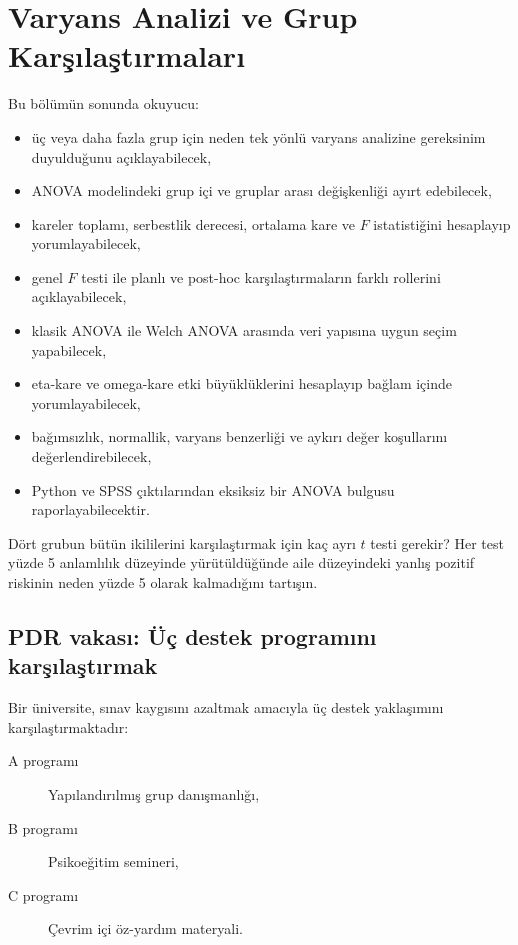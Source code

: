 \chapter{Varyans Analizi ve Grup Karşılaştırmaları}
\label{ch:anova}

\begin{hedefler}
Bu bölümün sonunda okuyucu:
\begin{itemize}
  \item üç veya daha fazla grup için neden tek yönlü varyans analizine gereksinim duyulduğunu açıklayabilecek,
  \item ANOVA modelindeki grup içi ve gruplar arası değişkenliği ayırt edebilecek,
  \item kareler toplamı, serbestlik derecesi, ortalama kare ve $F$ istatistiğini hesaplayıp yorumlayabilecek,
  \item genel $F$ testi ile planlı ve post-hoc karşılaştırmaların farklı rollerini açıklayabilecek,
  \item klasik ANOVA ile Welch ANOVA arasında veri yapısına uygun seçim yapabilecek,
  \item eta-kare ve omega-kare etki büyüklüklerini hesaplayıp bağlam içinde yorumlayabilecek,
  \item bağımsızlık, normallik, varyans benzerliği ve aykırı değer koşullarını değerlendirebilecek,
  \item Python ve SPSS çıktılarından eksiksiz bir ANOVA bulgusu raporlayabilecektir.
\end{itemize}
\end{hedefler}

\begin{hazirlik}
Dört grubun bütün ikililerini karşılaştırmak için kaç ayrı $t$ testi gerekir?
Her test yüzde 5 anlamlılık düzeyinde yürütüldüğünde aile düzeyindeki yanlış
pozitif riskinin neden yüzde 5 olarak kalmadığını tartışın.
\end{hazirlik}

\section{PDR vakası: Üç destek programını karşılaştırmak}

Bir üniversite, sınav kaygısını azaltmak amacıyla üç destek yaklaşımını
karşılaştırmaktadır:

\begin{description}
  \item[A programı] Yapılandırılmış grup danışmanlığı,
  \item[B programı] Psikoeğitim semineri,
  \item[C programı] Çevrim içi öz-yardım materyali.
\end{description}


